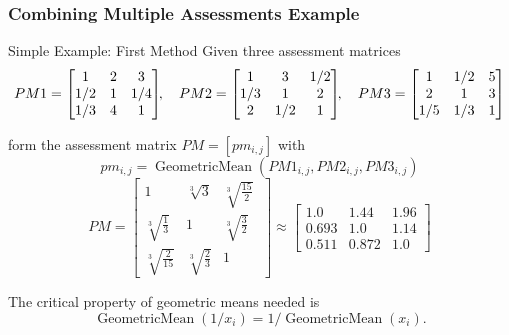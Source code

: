 \documentclass[10pt,handout,hyperref={colorlinks=true,linkcolor=blue,citecolor=citelink,urlcolor=gray}]{beamer}
\newcounter{e_temp}
\begin{document}
\begin{frame}
\frametitle{Combining Multiple Assessments Example}
\vspace{-1ex}
{\small
\begin{block}{Simple Example: First Method}
Given three assessment matrices 
\vspace{-1ex}
\[	PM1 = \begin{bmatrix} 1&2&3 \\ 1/2&1&1/4 \\ 1/3&4&1 \end{bmatrix}\!\!, 
	\quad PM2 = \begin{bmatrix} 1&3&1/2 \\ 1/3&1&2 \\ 2&1/2&1 \end{bmatrix}\!\!,
	\quad PM3 = \begin{bmatrix} 1&1/2&5 \\ 2&1&3 \\ 1/5&1/3&1 \end{bmatrix}
	\vspace{-1ex}	\]
\pause

form the assessment matrix $PM=[pm_{i,j}]$ with 
\[	pm_{i,j}=\operatorname{GeometricMean}(PM1_{i,j},PM2_{i,j},PM3_{i,j})	\]
\[	PM = \begin{bmatrix} 1&\sqrt[3]{3}& \sqrt[3]{\frac{15}{2}}\; \\[0.75ex]
		\sqrt[3]{\frac{1}{3}} &1& \sqrt[3]{\frac{3}{2}} \\[0.75ex] 
		\sqrt[3]{\frac{2}{15}} & \sqrt[3]{\frac{2}{3}} &1 \end{bmatrix} 
	\approx \begin{bmatrix} 1.0& 1.44& 1.96 \\ 0.693& 1.0& 1.14 \\ 0.511 & 0.872& 1.0 \end{bmatrix}	\]
\pause
\vspace{2ex}

The critical property of geometric means needed is
\vspace{-1ex}
\[	\operatorname{GeometricMean}(1/x_i) = 1/ \operatorname{GeometricMean}(x_i).	\]
\end{block}
}
\end{frame}
\end{document}
